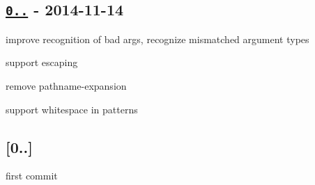 \subsection*{\href{https://github.com/micromatch/braces/compare/0.1.0...0.1.4}{\tt 0..} -\/ 2014-\/11-\/14}


\begin{DoxyItemize}
\item improve recognition of bad args, recognize mismatched argument types
\item support escaping
\item remove pathname-\/expansion
\item support whitespace in patterns
\end{DoxyItemize}

\subsection*{\mbox{[}0..\mbox{]}}


\begin{DoxyItemize}
\item first commit 
\end{DoxyItemize}